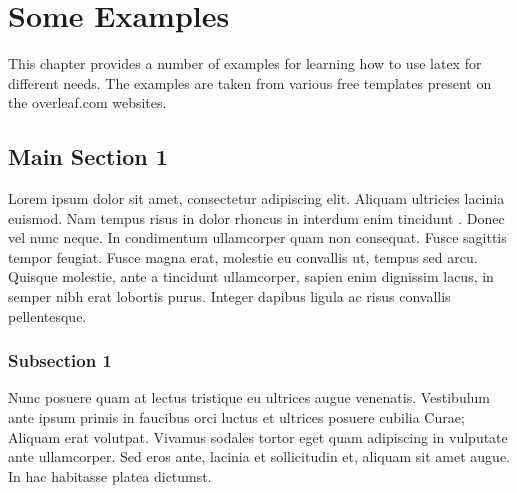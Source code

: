 
\chapter{Some Examples} %

\label{Chapter3} %

\begin{sloppypar}
This chapter provides a number of examples for learning how to use latex for different needs. The examples are taken from various free templates present on the overleaf.com websites.



\section{Main Section 1}

Lorem ipsum dolor sit amet, consectetur adipiscing elit. Aliquam ultricies lacinia euismod. Nam tempus risus in dolor rhoncus in interdum enim tincidunt \parencite{Reference2}. Donec vel nunc neque. In condimentum ullamcorper quam non consequat. Fusce sagittis tempor feugiat. Fusce magna erat, molestie eu convallis ut, tempus sed arcu. Quisque molestie, ante a tincidunt ullamcorper, sapien enim dignissim lacus, in semper nibh erat lobortis purus. Integer dapibus ligula ac risus convallis pellentesque.

\subsection{Subsection 1}

Nunc posuere quam at lectus tristique eu ultrices augue venenatis. Vestibulum ante ipsum primis in faucibus orci luctus et ultrices posuere cubilia Curae; Aliquam erat volutpat. Vivamus sodales tortor eget quam adipiscing in vulputate ante ullamcorper. Sed eros ante, lacinia et sollicitudin et, aliquam sit amet augue. In hac habitasse platea dictumst.


\end{sloppypar}
